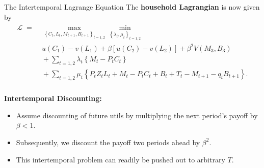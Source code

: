\documentclass[10pt,c,aspectratio=1610,handout]{beamer}
\begin{document}
\begin{frame}{The Intertemporal Lagrange Equation}%
  The \textbf{household Lagrangian} is now given by%
  \begin{align}%
    \begin{split}%
      \mathcal{L} \; = & \; \max_{\left\{ C_{t},L_{t},M_{t+1},B_{t+1}\right\}_{t=1,2}}\min_{\left\{ \lambda _{t},\mu _{t}\right\} _{t=1,2}}\ \\%
      & \; u(C_{1})-v(L_{1})+\beta \left[ u(C_{2})-v(L_{2})\right] +\beta^{2}V(M_{3},B_{3}) \\%
      & \; +\sum_{t=1,2}\lambda _{t}\left\{ M_{t}-P_{t}C_{t}\right\} \\%
      & \; +\sum_{t=1,2}\mu _{t}\left\{P_{t}Z_{t}L_{t}+M_{t}-P_{t}C_{t}+B_{t}+T_{t}-M_{t+1}-q_{t}B_{t+1}\right\}.%
    \end{split}%
  \end{align}\\%
  \vspace*{0.2in}%
  \pause%
  \textbf{Intertemporal Discounting:}%
  \begin{itemize}%
    \item[$\blacktriangleright$] Assume discounting of future utils by multiplying the next period's payoff by $\beta <1$.%
    \item[$\blacktriangleright$] Subsequently, we discount the payoff two periods ahead by $\beta ^{2}$.%
    \item[$\blacktriangleright$] This intertemporal problem can readily be pushed out to arbitrary $T$.%
  \end{itemize}%
\end{frame}%
\end{document}
